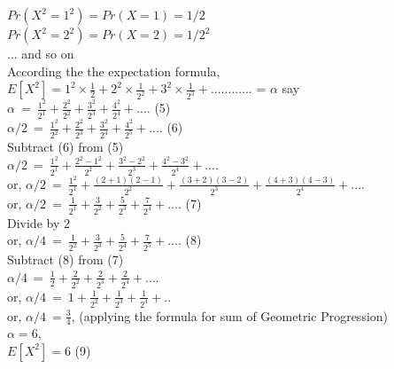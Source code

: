 \documentclass[a4paper]{article}
\begin{document}
$Pr(X^2=1^2) = Pr(X=1) = 1/2$\\

$Pr(X^2=2^2) = Pr(X=2) = 1/2^2$\\

... and so on \\

According the the expectation formula, $E[X^2] = 1^2 \times \frac{1}{2} + 2^2 \times \frac{1}{2^2} + 3^2 \times \frac{1}{2^3} + ............  $ = $\alpha$ say\\

$\alpha\ =\ \frac{1^2}{2^1} + \frac{2^2}{2^2} + \frac{3^2}{2^3} + \frac{4^2}{2^4} + .... $   (5) \\	


$\alpha/2\ =\ \frac{1^2}{2^2} + \frac{2^2}{2^3} + \frac{3^2}{2^4} + \frac{4^2}{2^5} + .... $   (6)  \\

Subtract (6) from (5)\\

$\alpha/2\ =\ \frac{1^2}{2^1} + \frac{2^2-1^2}{2^2} + \frac{3^2-2^2}{2^3} + \frac{4^2-3^2}{2^4} + .... $    \\


or, $\alpha/2\ =\ \frac{1^2}{2^1} + \frac{(2+1)(2-1)}{2^2} + \frac{(3+2)(3-2)}{2^3} + \frac{(4+3)(4-3)}{2^4} + .... $    \\


or, $\alpha/2\ =\ \frac{1}{2^1} + \frac{3}{2^2} + \frac{5}{2^3} + \frac{7}{2^4} + .... $     (7)\\	

Divide by 2\\

 or, $\alpha/4\ =\ \frac{1}{2^2} + \frac{3}{2^3} + \frac{5}{2^4} + \frac{7}{2^5} + .... $  (8)\\
 
 Subtract (8) from (7)\\
 
$\alpha/4\ =\ \frac{1}{2} + \frac{2}{2^2} + \frac{2}{2^3} + \frac{2}{2^4} + .... $\\

or, $\alpha/4\ =\ 1 + \frac{1}{2^2} + \frac{1}{2^3} + \frac{1}{2^4} + .. $\\ 

or, $\alpha/4\ =\frac{3}{4}$, (applying the formula for sum of Geometric Progression)\\

$\alpha = 6$, \\

$E[X^2]=6$	(9)\\
\end{document}
